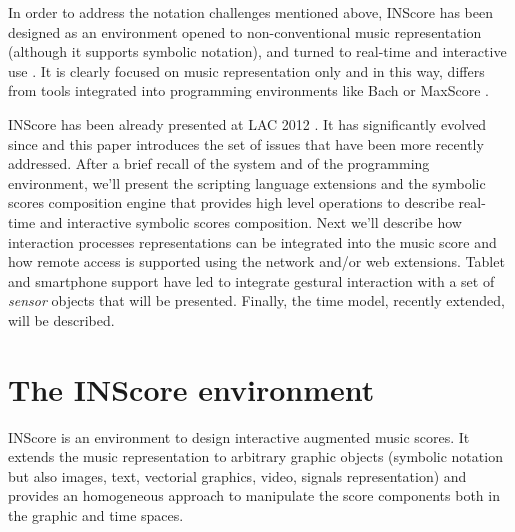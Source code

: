 \documentclass[11pt,a4paper]{article}
\begin{document}
In order to address the notation challenges mentioned above, INScore has been designed as an environment opened to non-conventional music representation (although it supports symbolic notation), and turned to real-time and interactive use \cite{Fober:13b}. It is clearly focused on music representation only and in this way, differs from tools integrated into programming environments like Bach \cite{agostini12b} or MaxScore \cite{didko08}. 

INScore has been already presented at LAC 2012 \cite{Fober:12a}. It has significantly evolved since and this paper introduces the set of issues that have been more recently addressed. After a brief recall of the system and of the programming environment, we'll present the scripting language extensions and the symbolic scores composition engine that provides high level operations to describe real-time and interactive symbolic scores composition. Next we'll describe how interaction processes representations can be integrated into the music score and how remote access is supported using the network and/or web extensions. Tablet and smartphone support have led to integrate gestural interaction with a set of \emph{sensor} objects that will be presented. Finally, the time model, recently extended, will be described.


\section{The INScore environment}
INScore is an environment to design interactive augmented music scores. It extends the music representation to arbitrary graphic objects (symbolic notation but also images, text, vectorial graphics, video, signals representation) and provides an homogeneous approach to manipulate the score components both in the graphic and time spaces. 
\end{document}
